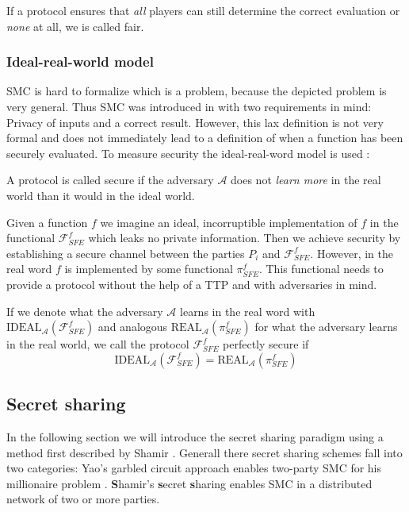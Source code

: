 \documentclass[12pt,a4paper]{scrartcl}				%
\begin{document}
If a protocol ensures that \textit{all} players can still determine the correct evaluation or \textit{none} at all, we is called fair. \cite[p.386]{smart2003}

\subsubsection{Ideal-real-world model}
SMC is hard to formalize which is a problem, because the depicted problem is very general. Thus SMC was introduced in with two requirements in mind: Privacy of inputs and a correct result. However, this lax definition is not very formal and does not immediately lead to a definition of when a function has been securely evaluated. To measure security the ideal-real-word model is used \cite{cramer2009, CZ}:

A protocol is called secure if the adversary $\mathcal{A}$ does not \textit{learn more} in the real world than it would in the ideal world. 

Given a function $f$ we imagine an ideal, incorruptible implementation of $f$ in the functional $\mathcal{F}^f_{SFE}$ which leaks no private information. Then we achieve security by establishing a secure channel between the parties $P_i$ and $\mathcal{F}^f_{SFE}$. However, in the real word $f$ is implemented by some functional $\pi^f_{SFE}$. This functional needs to provide a protocol without the help of a TTP and with adversaries in mind. 

If we denote what the adversary $\mathcal{A}$ learns in the real word with $\text{IDEAL}_{\mathcal{A}}(\mathcal{F}^f_{SFE})$ and analogous $\text{REAL}_{\mathcal{A}}(\pi^f_{SFE})$ for what the adversary learns in the real world, we call the protocol $\mathcal{F}^f_{SFE}$ perfectly secure if
\begin{equation*}
\text{IDEAL}_{\mathcal{A}}(\mathcal{F}^f_{SFE}) = \text{REAL}_{\mathcal{A}}(\pi^f_{SFE})
\end{equation*}

\subsection{Secret sharing}
In the following section we will introduce the secret sharing paradigm using a method first described by Shamir \cite{shamir1979share}. Generall there secret sharing schemes fall into two categories: Yao's garbled circuit approach enables two-party SMC for his millionaire problem \cite{yao1982protocols}. \textbf{S}hamir's \textbf{s}ecret \textbf{s}haring enables SMC in a distributed network of two or more parties.
\end{document}
